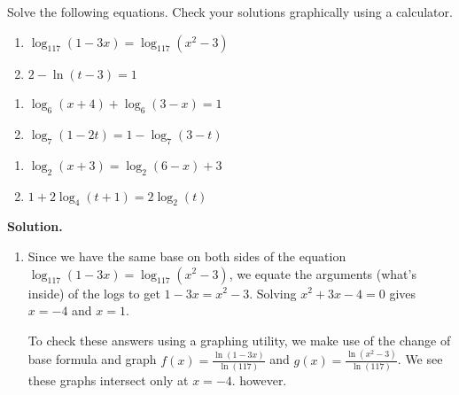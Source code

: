 \smallskip

\begin{ex}  \label{LogEqnsEx1} Solve the following equations.  Check your solutions graphically using a calculator.

\begin{multicols}{2}
\begin{enumerate}

\item  $\log_{117}(1-3x) = \log_{117}\left(x^2-3\right)$

\item  $2 - \ln(t-3) = 1$

\setcounter{HW}{\value{enumi}}
\end{enumerate}
\end{multicols}

\begin{multicols}{2}
\begin{enumerate}
\setcounter{enumi}{\value{HW}}

\item  $\log_{6}(x+4) + \log_{6}(3-x) = 1$

\item  $\log_{7}(1-2t) = 1 - \log_{7}(3-t)$
\setcounter{HW}{\value{enumi}}
\end{enumerate}
\end{multicols}

\begin{multicols}{2}
\begin{enumerate}
\setcounter{enumi}{\value{HW}}

\item  $\log_{2}(x+3) = \log_{2}(6-x)+3$

\item  $1 + 2 \log_{4}(t+1) = 2 \log_{2}(t)$

\end{enumerate}
\end{multicols}

{\bf Solution.}

\begin{enumerate}

\item  Since we have the same base on both sides of the equation $\log_{117}(1-3x) = \log_{117}\left(x^2-3\right)$, we equate the arguments (what's inside) of the logs to get $1-3x = x^2-3$.  Solving $x^2+3x-4 = 0$ gives $x=-4$ and $x=1$. 

\smallskip

To check these answers using a graphing utility,  we make use of the change of base formula and graph $f(x) = \frac{\ln(1-3x)}{\ln(117)}$ and $g(x) = \frac{\ln\left(x^2-3\right)}{\ln(117)}$.  We see these graphs intersect only at $x=-4$. however.  


\end{enumerate}
\end{ex}

